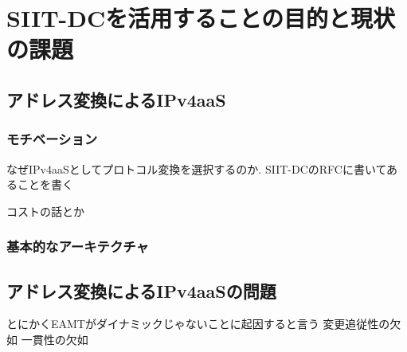 \chapter{SIIT-DCを活用することの目的と現状の課題}
\label{issue}

\section{アドレス変換によるIPv4aaS}
\subsection{モチベーション}

なぜIPv4aaSとしてプロトコル変換を選択するのか.
SIIT-DCのRFCに書いてあることを書く


コストの話とか


\subsection{基本的なアーキテクチャ}


\section{アドレス変換によるIPv4aaSの問題}

とにかくEAMTがダイナミックじゃないことに起因すると言う
変更追従性の欠如
一貫性の欠如


